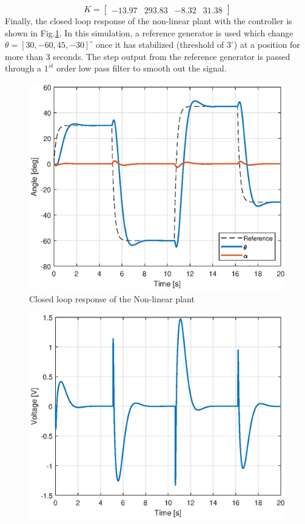\documentclass[superscriptaddress,floatfix,reprint,amssymb, amsmath,aps, pre]{revtex4-1}
\begin{document}
{{\begin{equation}
            K = \begin{bmatrix}
                -13.97 & 293.83 &  -8.32 &  31.38
            \end{bmatrix}
        \end{equation}
        Finally, the closed loop response of the non-linear plant with the controller is shown in Fig.\ref{fig:closedControl}. In this simulation, a reference generator is used which change \(\theta = [30,-60,45,-30]^\circ\) once it has stabilized (threshold of \(3^\circ\)) at a position for more than 3 seconds. The step output from the reference generator is passed through a \(1^{st}\) order low pass filter to smooth out the signal. 
        \begin{figure}[t!]
            \includegraphics[width = \linewidth]{closedControl.eps}
            \caption{Closed loop response of the Non-linear plant}
            \label{fig:closedControl}
        \end{figure}
        \begin{figure}[t!]
            \includegraphics[width = \linewidth]{controllerEffort.eps}

\end{figure}}}
\end{document}
